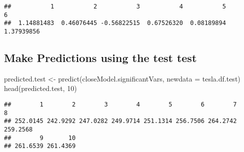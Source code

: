 \documentclass[
]{article}
\newenvironment{Shaded}{\begin{snugshade}}{\end{snugshade}}
\newcommand{\AttributeTok}[1]{\textcolor[rgb]{0.77,0.63,0.00}{#1}}
\newcommand{\CommentTok}[1]{\textcolor[rgb]{0.56,0.35,0.01}{\textit{#1}}}
\newcommand{\DecValTok}[1]{\textcolor[rgb]{0.00,0.00,0.81}{#1}}
\newcommand{\FloatTok}[1]{\textcolor[rgb]{0.00,0.00,0.81}{#1}}
\newcommand{\FunctionTok}[1]{\textcolor[rgb]{0.00,0.00,0.00}{#1}}
\newcommand{\NormalTok}[1]{#1}
\newcommand{\OtherTok}[1]{\textcolor[rgb]{0.56,0.35,0.01}{#1}}
\newcommand{\SpecialCharTok}[1]{\textcolor[rgb]{0.00,0.00,0.00}{#1}}
\newcommand{\StringTok}[1]{\textcolor[rgb]{0.31,0.60,0.02}{#1}}
\begin{document}
\begin{Shaded}
\end{Shaded}

\begin{verbatim}
##           1           2           3           4           5           6 
##  1.14881483  0.46076445 -0.56822515  0.67526320  0.08189894  1.37939856
\end{verbatim}

\hypertarget{make-predictions-using-the-test-test}{%
\subsection{Make Predictions using the test
test}\label{make-predictions-using-the-test-test}}

\begin{Shaded}
\begin{Highlighting}[]
\NormalTok{predicted.test }\OtherTok{\textless{}{-}} \FunctionTok{predict}\NormalTok{(closeModel.significantVars, }\AttributeTok{newdata =}\NormalTok{ tesla.df.test)}
\FunctionTok{head}\NormalTok{(predicted.test, }\DecValTok{10}\NormalTok{)}
\end{Highlighting}
\end{Shaded}

\begin{verbatim}
##        1        2        3        4        5        6        7        8 
## 252.0145 242.9292 247.0282 249.9714 251.1314 256.7506 264.2742 259.2568 
##        9       10 
## 261.6539 261.4369
\end{verbatim}

\begin{Shaded}
\end{Shaded}
\end{document}
